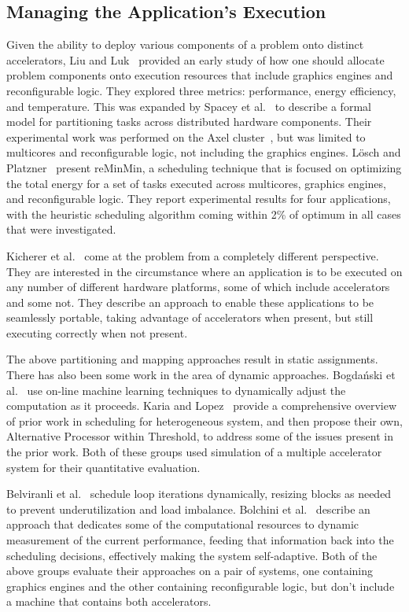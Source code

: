 \subsection{Managing the Application's Execution}

Given the ability to deploy various components of a problem onto distinct
accelerators, Liu and Luk~\cite{ll11,ll12} provided an early study of how one
should allocate problem components onto execution resources that include
graphics engines and reconfigurable logic.  They explored
three metrics: performance, energy efficiency, and temperature.
This was expanded by Spacey et al.~\cite{slkk13} to describe a formal
model for partitioning tasks across distributed hardware components.
Their experimental work was performed on the Axel cluster~\cite{tl10},
but was limited to multicores and reconfigurable logic, not including
the graphics engines.
L\"{o}sch and Platzner~\cite{lp17} present reMinMin, a scheduling technique
that is focused on optimizing the total energy for a set of tasks executed
across multicores, graphics engines, and reconfigurable logic.  They
report experimental results for four applications, with the heuristic
scheduling algorithm coming within 2\% of optimum in all cases that
were investigated.

Kicherer et al.~\cite{knbk12} come at the problem from a completely
different perspective.  They are interested in the circumstance where an
application is to be executed on any number of different hardware platforms,
some of which include accelerators and some not.  They describe an approach
to enable these applications to be seamlessly portable, taking advantage of
accelerators when present, but still executing correctly when not present.

The above partitioning and mapping approaches result in static assignments.
There has also been some work in the area of dynamic approaches.
Bogda\'{n}ski et al.~\cite{blby11} use on-line machine learning techniques to
dynamically adjust the computation as it proceeds.
Karia and Lopez~\cite{kl17} provide a comprehensive overview of prior
work in scheduling for heterogeneous system, and then propose their own,
Alternative Processor within Threshold, to address some of the issues
present in the prior work.
Both of these groups used simulation
of a multiple accelerator system for their quantitative evaluation.

Belviranli et al.~\cite{bbg13} schedule loop iterations dynamically, resizing
blocks as needed to prevent underutilization and load imbalance.
Bolchini et al.~\cite{bdm+15} describe an approach that dedicates some of the
computational resources to dynamic measurement of the current performance,
feeding that information back into the scheduling decisions, effectively
making the system self-adaptive.
Both of the above groups
evaluate their approaches on a pair of systems, one containing graphics
engines and the other containing reconfigurable logic, but don't include
a machine that contains both accelerators.

